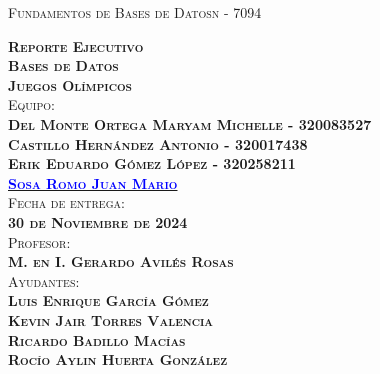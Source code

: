 \begin{titlepage}
\begin{minipage}[c][0.81\textheight][t]{0.75\textwidth}
\begin{center}
			{\large\scshape Fundamentos de Bases de Datosn - 7094}\\[.2in]
			
			\vspace{2cm}            
			
			\textsc{\Huge
				\textbf{Reporte Ejecutivo \\\vspace{.4cm}  Bases de Datos \\\vspace{.7cm} Juegos Olímpicos}
				}\\[1.7cm]

			\textsc{\Large{Equipo:} \vspace{.2cm}\normalsize \\
                \vspace{.3cm}
				\textbf{Del Monte Ortega Maryam Michelle - 320083527 \\
				\vspace{.2cm}
				Castillo Hernández Antonio - 320017438 \\
				\vspace{.2cm}
				Erik Eduardo Gómez López - 320258211 \\
				\vspace{.2cm}
				\href{https://github.com/JuanSosaCiencias}{\textcolor{blue}{Sosa Romo Juan Mario}} }}\\[0.5cm]     
			
			\textsc{{Fecha de entrega: \vspace{.2cm} \\ \textbf{30 de Noviembre de 2024}}}\\[0.5cm]        
			
			\textsc{{Profesor:  \vspace{.2cm}\\ \textbf{M. en I. Gerardo Avilés Rosas}}}\\[0.5cm]  
			
			\textsc{Ayudantes: \vspace{.2cm} \\ \textbf{Luis Enrique García Gómez \\ \vspace{.2cm} Kevin Jair Torres Valencia \\ \vspace{.2cm} Ricardo Badillo Macías \\ \vspace{.2cm} Rocío Aylin Huerta González  } }
			
			
			\vspace{0.5cm}
		\end{center}
	\end{minipage}
\end{titlepage}
